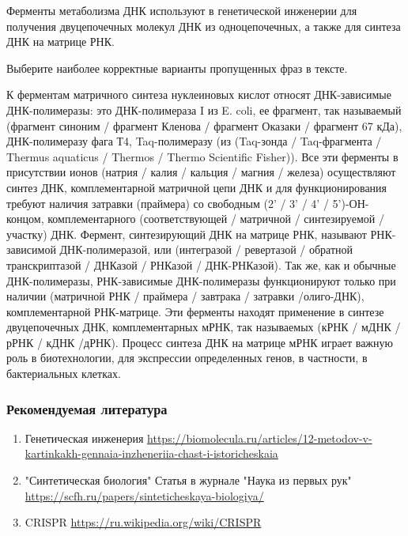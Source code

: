 
Ферменты метаболизма ДНК используют в генетической инженерии для получения двуцепочечных молекул ДНК из одноцепочечных, а также для синтеза ДНК на матрице РНК.

Выберите наиболее корректные варианты пропущенных фраз в тексте.

К ферментам матричного синтеза нуклеиновых кислот относят ДНК-зависимые ДНК-полимеразы: это ДНК-полимераза I из E. coli, ее фрагмент, так называемый 
(фрагмент синоним / фрагмент Кленова / фрагмент Оказаки / фрагмент 67 кДа), ДНК-полимеразу фага Т4, Taq-полимеразу (из 
(Taq-зонда / Taq-фрагмента / Thermus aquaticus / Thermos / Thermo Scientific Fisher)). Все эти ферменты в присутствии ионов 
(натрия / калия / кальция / магния / железа) осуществляют синтез ДНК, комплементарной матричной цепи ДНК и для функционирования требуют наличия затравки (праймера) со свободным 
(2' / 3' / 4' / 5')-ОН-концом, комплементарного (соответствующей / матричной / синтезируемой / участку) ДНК. Фермент, синтезирующий ДНК на матрице РНК, называют РНК-зависимой ДНК-полимеразой, или 
(интегразой / ревертазой / обратной транскриптазой / ДНКазой / РНКазой / ДНК-РНКазой). Так же, как и обычные ДНК-полимеразы, РНК-зависимые ДНК-полимеразы функционируют только при наличии 
(матричной РНК / праймера / завтрака / затравки /олиго-ДНК), комплементарной РНК-матрице. Эти ферменты находят применение в синтезе двуцепочечных ДНК, комплементарных мРНК, так называемых 
(кРНК / мДНК / рРНК / кДНК /дРНК). Процесс синтеза ДНК на матрице мРНК играет важную роль в биотехнологии, для экспрессии определенных генов, в частности, в бактериальных клетках. 

\subsubsection*{Рекомендуемая литература}

\begin{enumerate}
    \item Генетическая инженерия \url{https://biomolecula.ru/articles/12-metodov-v-kartinkakh-gennaia-inzheneriia-chast-i-istoricheskaia}
    \item "Синтетическая биология" Статья в журнале "Наука из первых рук" \url{https://scfh.ru/papers/sinteticheskaya-biologiya/}
    \item CRISPR \url{https://ru.wikipedia.org/wiki/CRISPR}
\end{enumerate}